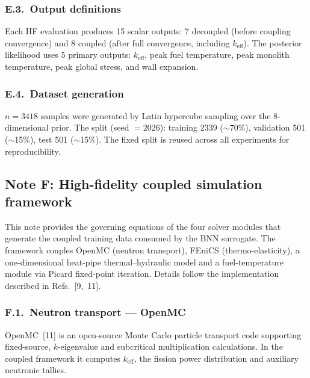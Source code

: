 \documentclass[11pt,a4paper]{article}
\newcommand{\keff}{\ensuremath{k_{\mathrm{eff}}}}
\begin{document}
\subsubsection*{E.3.~Output definitions}

Each HF evaluation produces 15 scalar outputs: 7 decoupled (before
coupling convergence) and 8 coupled (after full convergence, including
\keff{}). The posterior likelihood uses 5 primary outputs: \keff{}, peak
fuel temperature, peak monolith temperature, peak global stress, and
wall expansion.

\subsubsection*{E.4.~Dataset generation}

$n = 3418$ samples were generated by Latin hypercube sampling over the
8-dimensional prior. The split (seed $= 2026$): training 2339 ($\sim$70\%),
validation 501 ($\sim$15\%), test 501 ($\sim$15\%). The fixed split is reused
across all experiments for reproducibility.


\subsection{Note F: High-fidelity coupled simulation framework}
\label{sec:noteF}

This note provides the governing equations of the four solver modules
that generate the coupled training data consumed by the BNN surrogate.
The framework couples OpenMC (neutron transport), FEniCS
(thermo-elasticity), a one-dimensional heat-pipe thermal--hydraulic
model and a fuel-temperature module via Picard fixed-point iteration.
Details follow the implementation described in Refs.~[9,~11].

\subsubsection*{F.1.~Neutron transport --- OpenMC}

OpenMC~[11] is an open-source Monte Carlo particle transport code
supporting fixed-source, $k$-eigenvalue and subcritical multiplication
calculations. In the coupled framework it computes \keff{}, the
fission power distribution and auxiliary neutronic tallies.
\end{document}
